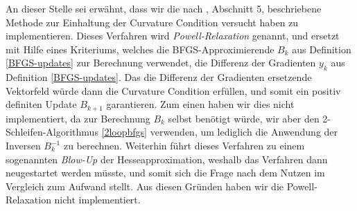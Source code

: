 An dieser Stelle sei erwähnt, dass wir die nach \cite{Powell}, Abschnitt 5, beschriebene Methode zur Einhaltung der Curvature Condition versucht haben zu implementieren. Dieses Verfahren wird \textit{Powell-Relaxation} genannt, und ersetzt mit Hilfe eines Kriteriums, welches die BFGS-Approximierende $B_k$ aus Definition \ref{BFGS-updates} zur Berechnung verwendet, die Differenz der Gradienten $y_k$ aus Definition \ref{BFGS-updates}. Das die Differenz der Gradienten ersetzende Vektorfeld würde dann die Curvature Condition erfüllen, und somit ein positiv definiten Update $B_{k+1}$ garantieren. Zum einen haben wir dies nicht implementiert, da zur Berechnung $B_k$ selbst benötigt würde, wir aber den 2-Schleifen-Algorithmus \ref{2loopbfgs} verwenden, um lediglich die Anwendung der Inversen $B_k^{-1}$ zu berechnen. Weiterhin führt dieses Verfahren zu einem sogenannten \textit{Blow-Up} der Hesseapproximation, weshalb das Verfahren dann neugestartet werden müsste, und somit sich die Frage nach dem Nutzen im Vergleich zum Aufwand stellt. Aus diesen Gründen haben wir die Powell-Relaxation nicht implementiert.

